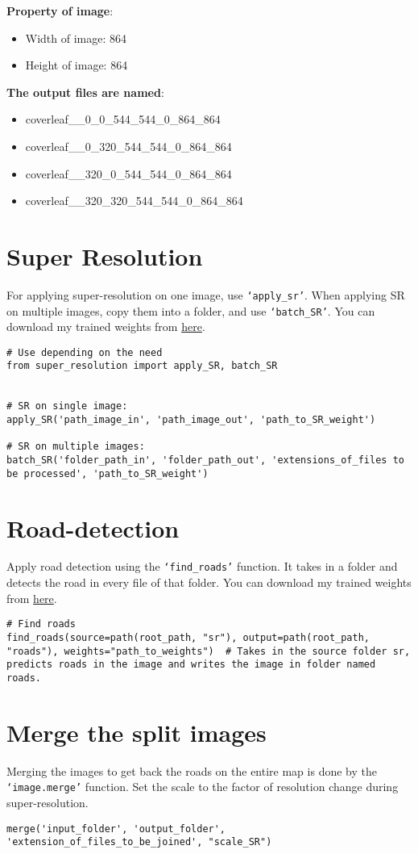 \textbf{Property of image}:
\begin{itemize}
  \setlength\itemsep{1mm}
  \item Width of image: 864
  \item Height of image: 864
\end{itemize}

\textbf{The output files are named}:
\begin{itemize}[>]
  \setlength\itemsep{1mm}
  \item coverleaf\_\_0\_0\_544\_544\_0\_864\_864
  \item coverleaf\_\_0\_320\_544\_544\_0\_864\_864
  \item coverleaf\_\_320\_0\_544\_544\_0\_864\_864
  \item coverleaf\_\_320\_320\_544\_544\_0\_864\_864
\end{itemize}

\section{Super Resolution}
For applying super-resolution on one image, use \texttt{`apply\_sr'}. When applying SR on multiple images, copy them into a folder, and use \texttt{`batch\_SR'}. You can download my trained weights from \href{https://nautatva.github.io/btp/weight/sr}{here}.

\begin{verbatim}
# Use depending on the need
from super_resolution import apply_SR, batch_SR


# SR on single image:
apply_SR('path_image_in', 'path_image_out', 'path_to_SR_weight')

# SR on multiple images:
batch_SR('folder_path_in', 'folder_path_out', 'extensions_of_files to be processed', 'path_to_SR_weight')
\end{verbatim}


\section{Road-detection}
Apply road detection using the \texttt{`find\_roads'} function. It takes in a folder and detects the road in every file of that folder. You can download my trained weights from \href{https://nautatva.github.io/btp/weight/road}{here}.

\begin{verbatim}
# Find roads
find_roads(source=path(root_path, "sr"), output=path(root_path, "roads"), weights="path_to_weights")  # Takes in the source folder sr, predicts roads in the image and writes the image in folder named roads.
\end{verbatim}

\section{Merge the split images}
Merging the images to get back the roads on the entire map is done by the \texttt{`image.merge'} function.
Set the scale to the factor of resolution change during super-resolution.

\begin{verbatim}
merge('input_folder', 'output_folder', 'extension_of_files_to_be_joined', "scale_SR")
\end{verbatim}